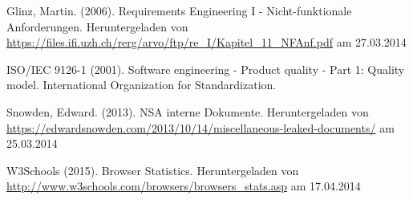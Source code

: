 \begin{thebibliography}{Literaturverzeichnis}
	
	 Glinz, Martin. (2006). Requirements
	Engineering I - Nicht-funktionale Anforderungen. Heruntergeladen von
	\url{https://files.ifi.uzh.ch/rerg/arvo/ftp/re\_I/Kapitel\_11\_NFAnf.pdf} am
	27.03.2014
	
	 \acs{ISO}/\acs{IEC} 9126-1 (2001).
	Software engineering - Product quality - Part 1: Quality model.
	International Organization for Standardization.
	
	 Snowden, Edward. (2013). \acs{NSA}
	interne Dokumente. Heruntergeladen von
	\url{https://edwardsnowden.com/2013/10/14/miscellaneous-leaked-documents/}
	am 25.03.2014
	
	 W3Schools (2015). Browser
	Statistics. Heruntergeladen von
	\url{http://www.w3schools.com/browsers/browsers_stats.asp} am 17.04.2014

\end{thebibliography}
